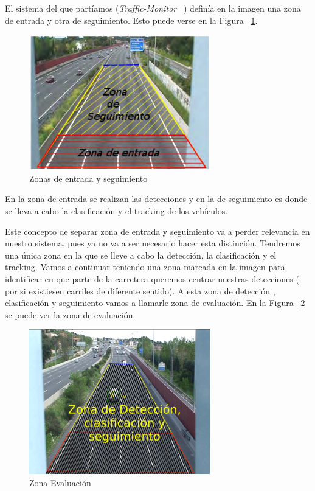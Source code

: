 El sistema del que partíamos (\textit{Traffic-Monitor} ~\cite{traffic_monitor_redo}) definía en la imagen una zona de entrada y otra de seguimiento. Esto puede verse en la Figura ~\ref{fig.zonas}.

\begin{figure}[H] 
\begin{center}
	\includegraphics[width=0.7\textwidth]{figures/Diseno_global/zonas.png}
   \caption{Zonas de entrada y seguimiento}
	\label{fig.zonas}
\end{center}
\end{figure}

En la zona de entrada se realizan las detecciones y en la de seguimiento es donde se lleva a cabo la clasificación y el tracking de los vehículos.

Este concepto de separar zona de entrada y seguimiento va a perder relevancia en nuestro sistema, pues ya no va a ser necesario hacer esta distinción. Tendremos una única zona en la que se lleve a cabo la detección, la clasificación y el tracking. Vamos a continuar teniendo una zona marcada en la imagen para identificar en que parte de la carretera queremos centrar nuestras detecciones ( por si existiesen carriles de diferente sentido). A esta zona de detección , clasificación y seguimiento vamos a llamarle zona de evaluación. En la Figura ~\ref{fig.nueva_zona} se puede ver la zona  de evaluación.

\begin{figure}[H] 
\begin{center}
	\includegraphics[width=0.7\textwidth]{figures/Diseno_global/nueva_zona.png}
   \caption{Zona Evaluación}
	\label{fig.nueva_zona}
\end{center}
\end{figure}


